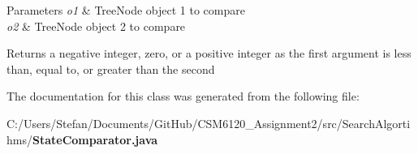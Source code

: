 \begin{DoxyParams}{Parameters}
{\em o1} & Tree\+Node object 1 to compare \\
\hline
{\em o2} & Tree\+Node object 2 to compare \\
\hline
\end{DoxyParams}
\begin{DoxyReturn}{Returns}
a negative integer, zero, or a positive integer as the first argument is less than, equal to, or greater than the second 
\end{DoxyReturn}


The documentation for this class was generated from the following file\+:\begin{DoxyCompactItemize}
\item 
C\+:/\+Users/\+Stefan/\+Documents/\+Git\+Hub/\+C\+S\+M6120\+\_\+\+Assignment2/src/\+Search\+Algortihms/{\bf State\+Comparator.\+java}\end{DoxyCompactItemize}
